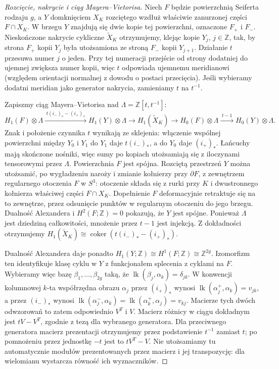 \begin{proof}[Rozcięcie, nakrycie i ciąg Mayera--Vietorisa]
Niech $F$ będzie powierzchnią Seiferta rodzaju $g$, a
$Y$ domknięciem $X_K$ rozciętego wzdłuż właściwie
zanurzonej części $F\cap X_K$. W brzegu $Y$ znajdują się
dwie kopie tej powierzchni, oznaczone $F_+$ i $F_-$.
Nieskończone nakrycie cykliczne $\widetilde X_K$ otrzymujemy,
klejąc kopie $Y_j$, $j\in\mathbb Z$, tak, by strona
$F_+$ kopii $Y_j$ była utożsamiona ze stroną $F_-$
kopii $Y_{j+1}$. Działanie $t$ przesuwa numer $j$ o jeden.
Przy tej numeracji przejście od strony dodatniej do ujemnej
zwiększa numer kopii, więc $t$ odpowiada ujemnemu meridianowi
(względem orientacji normalnej z dowodu o postaci przecięcia).
Jeśli wybieramy dodatni meridian jako generator nakrycia,
zamieniamy $t$ na $t^{-1}$.

Zapiszmy ciąg Mayera--Vietorisa nad
$\Lambda=\mathbb Z[t,t^{-1}]$:
\[
H_1(F)\otimes\Lambda\xrightarrow{\;t(i_-)_*-(i_+)_*\;}
H_1(Y)\otimes\Lambda\longrightarrow
H_1(\widetilde X_K)\longrightarrow
H_0(F)\otimes\Lambda\xrightarrow{\;t-1\;}
H_0(Y)\otimes\Lambda.
\]
Znak i położenie czynnika $t$ wynikają ze sklejenia:
włączenie wspólnej powierzchni między $Y_0$ i $Y_1$
do $Y_1$ daje $t(i_-)_*$, a do $Y_0$ daje $(i_+)_*$.
Łańcuchy mają skończone nośniki, więc sumy po kopiach
utożsamiają się z iloczynami tensorowymi przez $\Lambda$.
Powierzchnia $F$ jest spójna. Rozciętą przestrzeń $Y$
można utożsamić, po wygładzeniu naroży i zmianie kołnierzy
przy $\partial F$, z zewnętrzem regularnego otoczenia $F$
w $S^3$: otoczenie składa się z rurki przy $K$ i dwustronnego
kołnierza właściwej części $F\cap X_K$.
Dopełnienie $F$ deformacyjnie retraktuje się na to zewnętrze,
przez odsunięcie punktów w regularnym otoczeniu do jego brzegu.
Dualność Alexandera i $H^2(F;\mathbb Z)=0$ pokazują,
że $Y$ jest spójne. Ponieważ $\Lambda$ jest dziedziną
całkowitości, mnożenie przez $t-1$ jest injekcją.
Z dokładności otrzymujemy
$H_1(\widetilde X_K)\cong\operatorname{coker}
(t(i_-)_*-(i_+)_*)$.

Dualność Alexandera daje ponadto
$H_1(Y;\mathbb Z)\cong H^1(F;\mathbb Z)\cong\mathbb Z^{2g}$.
Izomorfizm ten identyfikuje klasę cyklu w $Y$ z funkcjonałem
splecenia z cyklami na $F$. Wybieramy więc bazę
$\beta_1,\dots,\beta_{2g}$ taką, że
$\operatorname{lk}(\beta_j,\alpha_k)=\delta_{jk}$.
W konwencji kolumnowej $k$-ta współrzędna obrazu $\alpha_j$
przez $(i_+)_*$ wynosi
$\operatorname{lk}(\alpha_j^+,\alpha_k)=v_{jk}$,
a przez $(i_-)_*$ wynosi
$\operatorname{lk}(\alpha_j^-,\alpha_k)
=\operatorname{lk}(\alpha_k^+,\alpha_j)=v_{kj}$.
Macierze tych dwóch odwzorowań to zatem odpowiednio
$V^T$ i $V$. Macierz różnicy w ciągu dokładnym jest
$tV-V^T$, zgodnie z tezą dla wybranego generatora.
Dla przeciwnego generatora macierz prezentacji otrzymujemy
przez podstawienie $t^{-1}$ zamiast $t$; po pomnożeniu
przez jednostkę $-t$ jest to $tV^T-V$.
Nie utożsamiamy tu automatycznie modułów prezentowanych
przez macierz i jej transpozycję: dla wielomianu wystarcza
równość ich wyznaczników.


\end{proof}
